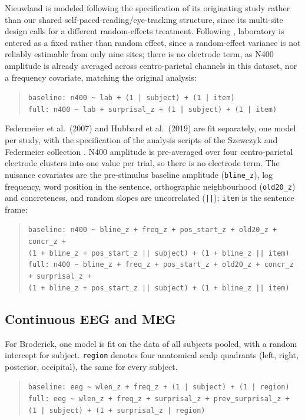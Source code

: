 Nieuwland is modeled following the specification of its originating study rather than our shared self-paced-reading/eye-tracking structure, since its multi-site design calls for a different random-effects treatment. Following \citet{nieuwland2018largescale}, laboratory is entered as a fixed rather than random effect, since a random-effect variance is not reliably estimable from only nine sites; there is no electrode term, as N400 amplitude is already averaged across centro-parietal channels in this dataset, nor a frequency covariate, matching the original analysis:
\begin{quote}
\texttt{baseline:\ n400 \textasciitilde\ lab + (1 | subject) + (1 | item)}\\
\texttt{full:\ n400 \textasciitilde\ lab + surprisal\_z + (1 | subject) + (1 | item)}
\end{quote}

Federmeier et al.\ (2007) and Hubbard et al.\ (2019) are fit separately, one model per study, with the specification of the analysis scripts of the Szewczyk and Federmeier collection \citep{szewczyk2022context}. N400 amplitude is pre-averaged over four centro-parietal electrode clusters into one value per trial, so there is no electrode term. The nuisance covariates are the pre-stimulus baseline amplitude (\texttt{bline\_z}), log frequency, word position in the sentence, orthographic neighbourhood (\texttt{old20\_z}) and concreteness, and random slopes are uncorrelated (\texttt{||}); \texttt{item} is the sentence frame:
\begin{quote}
\texttt{baseline:\ n400 \textasciitilde\ bline\_z + freq\_z + pos\_start\_z + old20\_z + concr\_z +}\\
\texttt{\phantom{baseline:\ n400 \textasciitilde\ }(1 + bline\_z + pos\_start\_z || subject) + (1 + bline\_z || item)}\\
\texttt{full:\ n400 \textasciitilde\ bline\_z + freq\_z + pos\_start\_z + old20\_z + concr\_z + surprisal\_z +}\\
\texttt{\phantom{full:\ n400 \textasciitilde\ }(1 + bline\_z + pos\_start\_z || subject) + (1 + bline\_z || item)}
\end{quote}

\subsection{Continuous EEG and MEG}

For Broderick, one model is fit on the data of all subjects pooled, with a random intercept for subject. \texttt{region} denotes four anatomical scalp quadrants (left, right, posterior, occipital), the same for every subject.
\begin{quote}
\texttt{baseline:\ eeg \textasciitilde\ wlen\_z + freq\_z + (1 | subject) + (1 | region)}\\
\texttt{full:\ eeg \textasciitilde\ wlen\_z + freq\_z + surprisal\_z + prev\_surprisal\_z + (1 | subject) + (1 + surprisal\_z | region)}
\end{quote}

